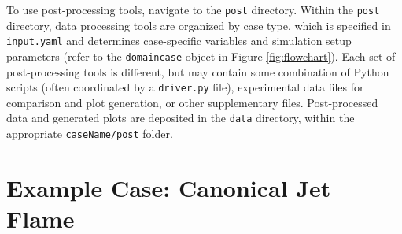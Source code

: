 \documentclass[preprint,12pt, a4paper]{elsarticle}
\begin{document}
To use post-processing tools, navigate to the \texttt{post} directory. Within the \texttt{post} directory, data processing tools are organized by case type, which is specified in \texttt{input.yaml} and determines case-specific variables and simulation setup parameters (refer to the \texttt{domaincase} object in Figure \ref{fig:flowchart}). Each set of post-processing tools is different, but may contain some combination of Python scripts (often coordinated by a \texttt{driver.py} file), experimental data files for comparison and plot generation, or other supplementary files. Post-processed data and generated plots are deposited in the \texttt{data} directory, within the appropriate \texttt{caseName/post} folder. 


\section{Example Case: Canonical Jet Flame}
\label{sec:examples}
\end{document}
